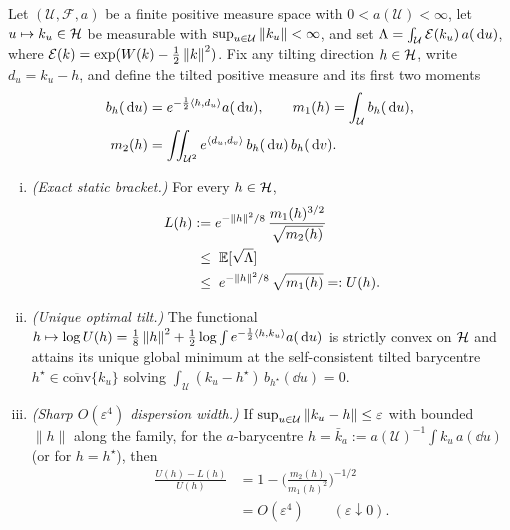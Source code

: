 \begin{theorem}\label{thm:tilted}
Let $(\mathcal{U},\mathcal{F},a)$ be a finite positive measure space with $0<a(\mathcal U)<\infty$, let $u\mapsto k_u\in\mathcal{H}$ be
measurable with $\sup_{u\in\mathcal{U}}\left\lVert k_u\right\rVert<\infty$, and set
$\Lambda=\int_{\mathcal{U}}\mathcal{E}(k_u)\,a(\,\mathrm{d} u)$, where $\mathcal{E}(k)=\exp(W(k)-\tfrac12\left\lVert k\right\rVert^2)$.
Fix any tilting direction $h\in\mathcal{H}$, write $d_u=k_u-h$, and define the tilted positive measure and its
first two moments
\begin{equation}\label{eq:tilted_moments}
\begin{split}
  b_h(\,\mathrm{d} u)&=e^{-\frac12\left\langle h,d_u\right\rangle}a(\,\mathrm{d} u),\qquad
  m_1(h)=\int_{\mathcal{U}} b_h(\,\mathrm{d} u),\\
  m_2(h)&=\iint_{\mathcal{U}^2} e^{\left\langle d_u,d_v\right\rangle}\,b_h(\,\mathrm{d} u)\,b_h(\,\mathrm{d} v).
\end{split}
\end{equation}
\begin{enumerate}[(i)]
\item \emph{(Exact static bracket.)} For every $h\in\mathcal{H}$,
  \begin{equation}\label{eq:tilted_bracket}
  \begin{split}
    L(h)&:=e^{-\left\lVert h\right\rVert^2/8}\,\frac{m_1(h)^{3/2}}{\sqrt{m_2(h)}}\\
    &\;\le\;\mathbb{E}[\sqrt{\Lambda}]\\
    &\;\le\;e^{-\left\lVert h\right\rVert^2/8}\,\sqrt{m_1(h)}=:U(h).
  \end{split}
  \end{equation}
\item \emph{(Unique optimal tilt.)} The functional $h\mapsto\log U(h)=\tfrac18\left\lVert h\right\rVert^2+\tfrac12\log\int
  e^{-\frac12\left\langle h,k_u\right\rangle}a(\,\mathrm{d} u)$ is strictly convex on $\mathcal{H}$ and attains its unique global minimum at
  the self-consistent tilted barycentre $h^\star\in\overline{\mathrm{conv}}\{k_u\}$ solving
  $\int_{\mathcal{U}}(k_u-h^\star)\,b_{h^\star}(\dd u)=0$.
\item \emph{(Sharp $O(\varepsilon^4)$ dispersion width.)} If $\sup_{u\in\mathcal{U}}\left\lVert k_u-h\right\rVert\le\varepsilon$
  with bounded $\|h\|$ along the family, for the $a$-barycentre $h=\bar k_a:=a(\mathcal{U})^{-1}\int k_u\,a(\dd u)$ (or for $h=h^\star$), then
  \begin{equation}\label{eq:eps4_rate}
  \begin{split}
    \frac{U(h)-L(h)}{U(h)}&=1-\Big(\frac{m_2(h)}{m_1(h)^2}\Big)^{-1/2}\\
    &=O(\varepsilon^4)\qquad(\varepsilon\downarrow0).

\end{split}
\end{equation}
\end{enumerate}
\end{theorem}
